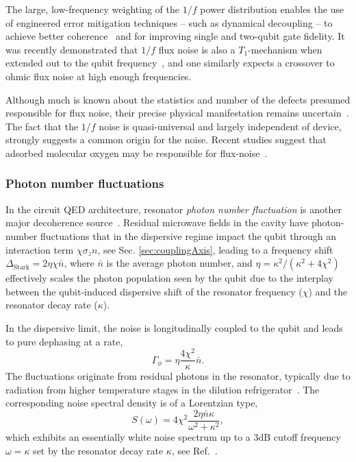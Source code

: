 \documentclass[aip,apr,twocolumn,showpacs,superscriptaddress,groupedaddress,nofootinbib,reprint]{revtex4-1}  %
\begin{document}
The large, low-frequency weighting of the $1/f$ power distribution enables the use of engineered error mitigation techniques -- such as dynamical decoupling -- to achieve better coherence~\cite{Falci2004,Bialczak2007,Bylander2011,Anton2012} and for improving single and two-qubit gate fidelity\cite{Pokharel2018}. It was recently demonstrated that $1/f$ flux noise is also a $T_1$-mechanism when extended out to the qubit frequency~\cite{Yan2016}, and one similarly expects a crossover to ohmic flux noise at high enough frequencies\cite{Quintana2017}.

Although much is known about the statistics and number of the defects presumed responsible for flux noise, their precise physical manifestation remains uncertain~\cite{KochRoger2007,Kumar2016}. The fact that the $1/f$ noise is quasi-universal and largely independent of device, strongly suggests a common origin for the noise. Recent studies suggest that adsorbed molecular oxygen may be responsible for flux-noise~\cite{Kumar2016,deGraaf2017}.

\subsubsection{\label{sec:photon-number-fluctuations}Photon number fluctuations}
In the circuit QED architecture, resonator \textit{photon number fluctuation} is another major decoherence source~\cite{Schuster2005}. Residual microwave fields in the cavity have photon-number fluctuations that in the dispersive regime impact the qubit through an interaction term $\chi\sigma_z n$, see Sec. \ref{sec:couplingAxis}, leading to a frequency shift $\Delta_{\mathrm{Stark}}=2\eta \chi \bar{n}$, where $\bar{n}$ is the average photon number, and $\eta=\kappa^2/(\kappa^2 + 4\chi^2)$ effectively scales the photon population seen by the qubit due to the interplay between the qubit-induced dispersive shift of the resonator frequency ($\chi$) and the resonator decay rate ($\kappa$).

In the dispersive limit, the noise is longitudinally coupled to the qubit and leads to pure dephasing at a rate,
\begin{equation}
    \Gamma_{\phi} = \eta \frac{4 \chi^2}{\kappa} \bar{n}.
\end{equation}
The fluctuations originate from residual photons in the resonator, typically due to radiation from higher temperature stages in the dilution refrigerator~\cite{Yeh2017,Yan2018}. The corresponding noise spectral density is of a Lorentzian type,
\begin{equation}
  S(\omega) = 4 \chi^2 \frac{2\eta\bar{n}\kappa}{\omega^2+\kappa^2},
\end{equation}
which exhibits an essentially white noise spectrum up to a $3\mathrm{dB}$ cutoff frequency $\omega = \kappa$ set by the resonator decay rate $\kappa$, see Ref.~.
\end{document}
